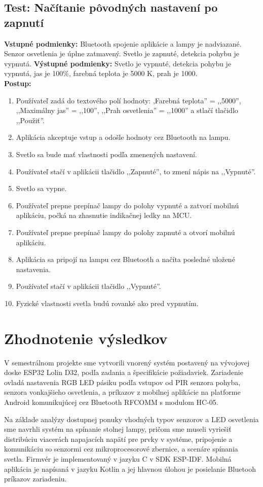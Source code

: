 \documentclass[12pt, a4paper]{article}
\begin{document}
\subsection{Test: Načítanie pôvodných nastavení po zapnutí}
\noindent\textbf{Vstupné podmienky:} Bluetooth spojenie aplikácie a lampy je nadviazané. Senzor osvetlenia je úplne zatmavený. Svetlo je zapnuté, detekcia pohybu je vypnutá.
\textbf{Výstupné podmienky:} Svetlo je vypnuté, detekcia pohybu je vypnutá, jas je 100\%, farebná teplota je 5000 K, prah je 1000. \\
\textbf{Postup:}
\begin{enumerate}
\itemsep0pt
\item Používateľ zadá do textového polí hodnoty: ,Farebná teplota'' = ,,5000'', ,,Maximálny jas'' = ,,100'',  ,,Prah osvetlenia'' = ,,1000'' a stlačí tlačidlo ,,Použiť''.
\item Aplikácia akceptuje vstup a odošle hodnoty cez Bluetooth na lampu.
\item Svetlo sa bude mať vlastnosti podľa zmenených nastavení.
\item Používateľ stačí v aplikácii tlačidlo ,,Zapnuté'', to zmení nápis na ,,Vypnuté''.
\item Svetlo sa vypne.
\item Používateľ prepne prepínač lampy do polohy vypnuté a zatvorí mobilnú aplikáciu, počká na zhasnutie indikačnej ledky na MCU.
\item Používateľ prepne prepínač lampy do polohy zapnuté a otvorí mobilnú aplikáciu.
\item Aplikácia sa pripojí na lampu cez Bluetooth a načíta posledné uložené nastavenia. 
\item Používateľ stačí v aplikácii tlačidlo ,,Vypnuté''.
\item Fyzické vlastnosti svetla budú rovanké ako pred vypnutím.
\end{enumerate}

\section{Zhodnotenie výsledkov}
V semestrálnom projekte sme vytvorili vnorený systém postavený na vývojovej doske ESP32 Lolin D32, podľa zadania a špecifikácie požiadaviek. Zariadenie ovladá nastavenia RGB LED pásiku podľa vstupov od PIR senzora pohyba, senzora vonkajšieho osvetlenia, a príkazov z mobilnej aplikácie na platforme Android komunikujúcej cez Bluetooth RFCOMM s modulom HC-05. 

Na základe analýzy dostupnej ponuky vhodných typov senzorov a LED osvetlenia sme navrhli systém na spínanie stolnej lampy, pričom sme museli vyriešiť distribúciu viacerách napajacích napätí pre prvky v systéme, pripojenie a komunikáciu so senzormi cez mikroprocesorové zbernice, a scenáre spínania svetla. Firmvér je implementovaný v jazyku C v SDK ESP-IDF. Mobilná aplikácia je napísaná v jazyku Kotlin a jej hlavnou úlohou je posielanie Bluetooh príkazov zariadeniu. 
\end{document}
